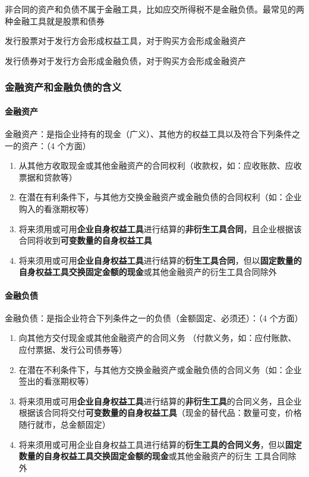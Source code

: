 \documentclass[UTF8,12pt]{ctexart}
\numberwithin{equation}{section} %
\numberwithin{figure}{section}
\numberwithin{table}{section}
\begin{document}
	非合同的资产和负债不属于金融工具，比如应交所得税不是金融负债。最常见的两种金融工具就是股票和债券
	
	发行股票对于发行方会形成权益工具，对于购买方会形成金融资产
	
	发行债券对于发行方会形成金融负债，对于购买方会形成金融资产
	
	\subsubsection{金融资产和金融负债的含义}
	
	\paragraph{金融资产}
	金融资产：是指企业持有的现金（广义）、其他方的权益工具以及符合下列条件之一的资产：（4 个方面）
	\begin{enumerate}
		\item 从其他方收取现金或其他金融资产的合同权利（收款权，如：应收账款、应收票据和贷款等）
		
		\item 在潜在有利条件下，与其他方交换金融资产或金融负债的合同权利（如：企业购入的看涨期权等）
		
		\item 将来须用或可用\textbf{企业自身权益工具}进行结算的\textbf{非衍生工具合同}，且企业根据该合同将收到\textbf{可变数量的自身权益工具}
		
		\item 将来须用或可用\textbf{企业自身权益工具}进行结算的\textbf{衍生工具合同}，但以\textbf{固定数量的自身权益工具交换固定金额的现金}或其他金融资产的衍生工具合同除外
	\end{enumerate}
	
	\paragraph{金融负债}
	
	金融负债：是指企业符合下列条件之一的负债（金额固定、必须还）：（4 个方面）
	\begin{enumerate}
		\item 向其他方交付现金或其他金融资产的合同义务
		（付款义务，如：应付账款、应付票据、发行公司债券等）
		
		\item 在潜在不利条件下，与其他方交换金融资产或金融负债的合同义务（如：企业签出的看涨期权等）
		
		\item 将来须用或可用\textbf{企业自身权益工具}进行结算的\textbf{非衍生工具}的合同义务，且企业根据该合同将交付\textbf{可变数量的自身权益工具}（现金的替代品：数量可变，价格随行就市，总金额固定）
		
		\item 将来须用或可用企业自身权益工具进行结算的\textbf{衍生工具的合同义务}，但以\textbf{固定数量的自身权益工具交换固定金额的现金}或其他金融资产的衍生 工具合同除外
	\end{enumerate}
\end{document}
